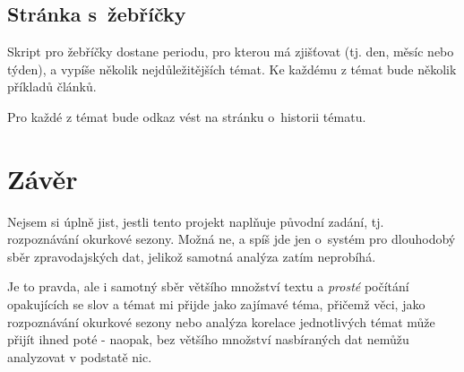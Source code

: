 \documentclass[12pt]{amsart}
\begin{document}
\subsection{Stránka s~žebříčky}
Skript pro žebříčky dostane periodu, pro kterou má zjišťovat (tj. den, měsíc nebo týden), a vypíše několik nejdůležitějších témat. Ke každému z témat bude několik příkladů článků.

Pro každé z témat bude odkaz vést na stránku o~historii tématu.

\section{Závěr}
Nejsem si úplně jist, jestli tento projekt naplňuje původní zadání, tj. rozpoznávání okurkové sezony. Možná ne, a spíš jde jen o~systém pro dlouhodobý sběr zpravodajských dat, jelikož samotná analýza zatím neprobíhá. 

Je to pravda, ale i samotný sběr většího množství textu a \emph{prosté} počítání opakujících se slov a témat mi přijde jako zajímavé téma, přičemž věci, jako rozpoznávání okurkové sezony nebo analýza korelace jednotlivých témat může přijít ihned poté - naopak, bez většího množství nasbíraných dat nemůžu analyzovat v podstatě nic.
\end{document}
